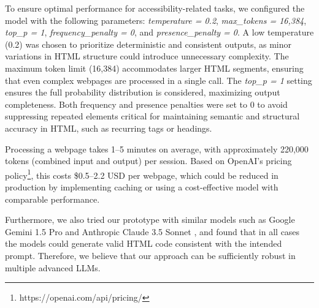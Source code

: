 To ensure optimal performance for accessibility-related tasks, we configured the model with the following parameters: \textit{temperature = 0.2}, \textit{max\_tokens = 16,384}, \textit{top\_p = 1}, \textit{frequency\_penalty = 0}, and \textit{presence\_penalty = 0}. A low temperature (0.2) was chosen to prioritize deterministic and consistent outputs, as minor variations in HTML structure could introduce unnecessary complexity. The maximum token limit (16,384) accommodates larger HTML segments, ensuring that even complex webpages are processed in a single call. The \textit{top\_p = 1} setting ensures the full probability distribution is considered, maximizing output completeness. Both frequency and presence penalties were set to 0 to avoid suppressing repeated elements critical for maintaining semantic and structural accuracy in HTML, such as recurring tags or headings.

Processing a webpage takes 1–5 minutes on average, with approximately 220,000 tokens (combined input and output) per session. Based on OpenAI’s pricing policy\footnote{https://openai.com/api/pricing/}, this costs \$0.5–2.2 USD per webpage, which could be reduced in production by implementing caching or using a cost-effective model with comparable performance.






Furthermore, we also tried our prototype with similar models such as Google Gemini 1.5 Pro \cite{gemini} and Anthropic Claude 3.5 Sonnet \cite{claude}, and found that in all cases the models could generate valid HTML code consistent with the intended prompt. Therefore, we believe that our approach can be sufficiently robust in multiple advanced LLMs.

